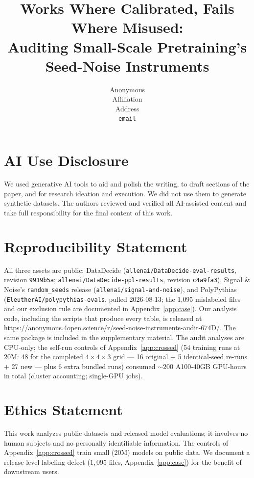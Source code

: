 \documentclass{article}
\title{Works Where Calibrated, Fails Where Misused:\\
Auditing Small-Scale Pretraining's Seed-Noise Instruments}
\author{Anonymous\\
Affiliation\\
Address\\
\texttt{email}}
\theoremstyle{remark}
\begin{document}
\maketitle
















\section*{AI Use Disclosure}
We used generative AI tools to aid and polish the writing, to draft sections of the
paper, and for research ideation and execution. We did not use them to generate synthetic
datasets. The authors reviewed and verified all AI-assisted content and take full
responsibility for the final content of this work.

\section*{Reproducibility Statement}
All three assets are public: DataDecide (\texttt{allenai/DataDecide-eval-results}, revision
\texttt{9919b5a}; \texttt{allenai/DataDecide-ppl-results}, revision \texttt{c4a9fa3}), Signal
\& Noise's \texttt{random\_seeds} release (\texttt{allenai/signal-and-noise}), and PolyPythias
(\texttt{EleutherAI/polypythias-evals}, pulled 2026-08-13; the 1{,}095 mislabeled files and our
exclusion rule are documented in Appendix~\ref{app:case}). Our analysis code, including the
scripts that produce every table, is released at
\url{https://anonymous.4open.science/r/seed-noise-instruments-audit-674D/}.
The same package is included in the supplementary material.
The audit analyses are CPU-only; the self-run controls of Appendix~\ref{app:crossed}
(54 training runs at 20M: 48 for the completed $4{\times}4{\times}3$ grid ---
16 original $+$ 5 identical-seed re-runs $+$ 27 new --- plus 6 extra bundled runs) consumed ${\sim}200$ A100-40GB
GPU-hours in total (cluster accounting; single-GPU jobs).

\section*{Ethics Statement}
This work analyzes public datasets and released model evaluations; it involves no human
subjects and no personally identifiable information. The controls of
Appendix~\ref{app:crossed} train small (20M) models on public data. We document a
release-level labeling defect ($1{,}095$ files, Appendix~\ref{app:case}) for the benefit of
downstream users.

\appendix








\end{document}
